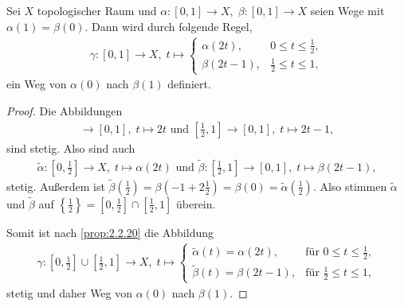 \begin{cor}
\label{prop:2.2.21}
Sei $X$ topologischer Raum und $\alpha: [0,1]\to X,\;\beta: [0,1]\to X$ seien
Wege mit $\alpha(1) = \beta(0)$. Dann wird durch folgende Regel,
\begin{align*}
\gamma: [0,1]\to X,\; t\mapsto \begin{cases}
                               \alpha(2t),& 0\le t\le \frac{1}{2},\\
                               \beta(2t-1),& \frac{1}{2}\le t\le 1,
                               \end{cases}
\end{align*}
ein Weg von $\alpha(0)$ nach $\beta(1)$ definiert.\fishhere
\end{cor}
\begin{proof}
Die Abbildungen
\begin{align*}
[0,\frac{1}{2}]\to[0,1],\; t\mapsto 2t \text{ und }
[\frac{1}{2},1]\to[0,1],\; t\mapsto 2t-1,
\end{align*}
sind stetig. Also sind auch
\begin{align*}
\tilde{\alpha}:[0,\frac{1}{2}]\to X,\;t\mapsto \alpha(2t) \text{ und }
\tilde{\beta}: [\frac{1}{2},1]\to[0,1],\;t\mapsto \beta(2t-1),
\end{align*}
stetig. Außerdem ist
$\tilde{\beta}(\frac{1}{2}) = \beta(-1+2\frac{1}{2})=\beta(0) =
\tilde{\alpha}(\frac{1}{2})$. Also stimmen $\tilde{\alpha}$ und $\tilde{\beta}$
auf $\left\{\frac{1}{2}\right\} = [0,\frac{1}{2}]\cap [\frac{1}{2},1]$ überein.

Somit ist nach \ref{prop:2.2.20} die Abbildung
\begin{align*}
\gamma: [0,\frac{1}{2}]\cup[\frac{1}{2},1] \to X,\; t\mapsto
\begin{cases}
\tilde{\alpha}(t)=\alpha(2t),&\text{für } 0\le t\le \frac{1}{2},\\
\tilde{\beta}(t) = \beta(2t-1),&\text{für }\frac{1}{2}\le t\le 1, 
\end{cases}
\end{align*}
stetig und daher Weg von $\alpha(0)$ nach $\beta(1)$.
\end{proof}

